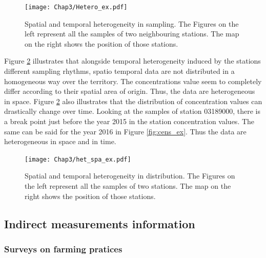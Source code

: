 \begin{figure}[ht]
    \centering
    \texttt{[image: Chap3/Hetero\_ex.pdf]}
    \caption{Spatial and temporal heterogeneity in sampling. The Figures on the left represent all the samples of two neighbouring stations. The map on the right shows the position of those stations.}
    \label{fig:het_samp_ex}
\end{figure}

Figure \ref{fig:het_spa_ex} illustrates that alongside temporal heterogeneity induced by the stations different sampling rhythms, spatio temporal data are not distributed in a homogeneous way over the territory. The concentrations value seem to completely differ according to their spatial area of origin. Thus, the data are heterogeneous in space. Figure \ref{fig:het_spa_ex} also illustrates that the distribution of concentration values can drastically change over time. Looking at the samples of station 03189000, there is a break point just before the year 2015 in the station concentration values. The same can be said for the year 2016 in Figure \ref{fig:cens_ex}. Thus the data are heterogeneous in space and in time.  

\begin{figure}[ht]
    \centering
    \texttt{[image: Chap3/het\_spa\_ex.pdf]}
    \caption{Spatial and temporal heterogeneity in distribution. The Figures on the left represent all the samples of two stations. The map on the right shows the position of those stations.}
    \label{fig:het_spa_ex}
\end{figure}

\subsection{Indirect measurements information}

\subsubsection{Surveys on farming pratices}

